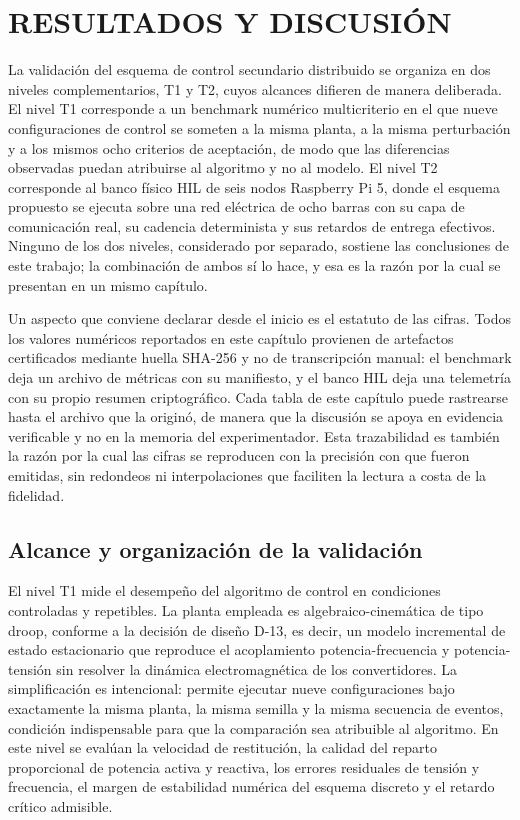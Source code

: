 \section{RESULTADOS Y DISCUSIÓN}
\label{sec:resultados}

La validación del esquema de control secundario distribuido se organiza en dos niveles complementarios, T1 y T2, cuyos alcances difieren de manera deliberada. El nivel T1 corresponde a un benchmark numérico multicriterio en el que nueve configuraciones de control se someten a la misma planta, a la misma perturbación y a los mismos ocho criterios de aceptación, de modo que las diferencias observadas puedan atribuirse al algoritmo y no al modelo. El nivel T2 corresponde al banco físico HIL de seis nodos Raspberry Pi 5, donde el esquema propuesto se ejecuta sobre una red eléctrica de ocho barras con su capa de comunicación real, su cadencia determinista y sus retardos de entrega efectivos. Ninguno de los dos niveles, considerado por separado, sostiene las conclusiones de este trabajo; la combinación de ambos sí lo hace, y esa es la razón por la cual se presentan en un mismo capítulo.

Un aspecto que conviene declarar desde el inicio es el estatuto de las cifras. Todos los valores numéricos reportados en este capítulo provienen de artefactos certificados mediante huella SHA-256 y no de transcripción manual: el benchmark deja un archivo de métricas con su manifiesto, y el banco HIL deja una telemetría con su propio resumen criptográfico. Cada tabla de este capítulo puede rastrearse hasta el archivo que la originó, de manera que la discusión se apoya en evidencia verificable y no en la memoria del experimentador. Esta trazabilidad es también la razón por la cual las cifras se reproducen con la precisión con que fueron emitidas, sin redondeos ni interpolaciones que faciliten la lectura a costa de la fidelidad.

\subsection{Alcance y organización de la validación}

El nivel T1 mide el desempeño del algoritmo de control en condiciones controladas y repetibles. La planta empleada es algebraico-cinemática de tipo droop, conforme a la decisión de diseño D-13, es decir, un modelo incremental de estado estacionario que reproduce el acoplamiento potencia-frecuencia y potencia-tensión sin resolver la dinámica electromagnética de los convertidores. La simplificación es intencional: permite ejecutar nueve configuraciones bajo exactamente la misma planta, la misma semilla y la misma secuencia de eventos, condición indispensable para que la comparación sea atribuible al algoritmo. En este nivel se evalúan la velocidad de restitución, la calidad del reparto proporcional de potencia activa y reactiva, los errores residuales de tensión y frecuencia, el margen de estabilidad numérica del esquema discreto y el retardo crítico admisible.

